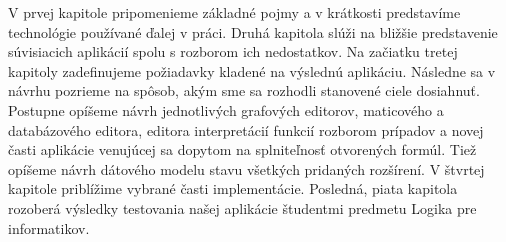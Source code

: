 
V prvej kapitole pripomenieme základné pojmy a v krátkosti predstavíme technológie používané ďalej v práci. Druhá kapitola slúži na bližšie predstavenie súvisiacich aplikácií spolu s rozborom ich nedostatkov. Na začiatku tretej kapitoly zadefinujeme požiadavky kladené na výslednú aplikáciu. Následne sa v návrhu pozrieme na spôsob, akým sme sa rozhodli stanovené ciele dosiahnuť. Postupne opíšeme návrh jednotlivých grafových editorov, maticového a databázového editora, editora interpretácií funkcií rozborom prípadov a novej časti aplikácie venujúcej sa dopytom na splniteľnosť otvorených formúl. Tiež opíšeme návrh dátového modelu stavu všetkých pridaných rozšírení. V štvrtej kapitole priblížime vybrané časti implementácie. Posledná, piata kapitola rozoberá výsledky testovania našej aplikácie študentmi predmetu Logika pre informatikov.



